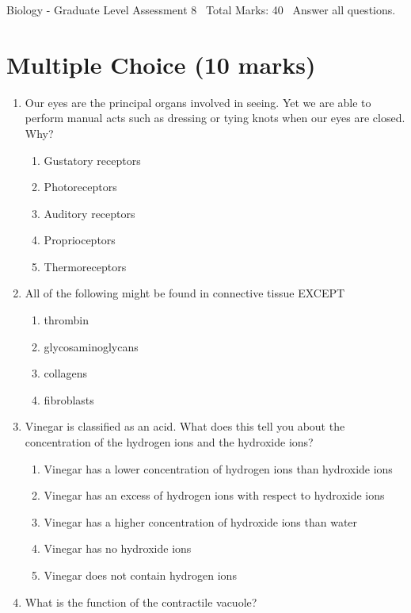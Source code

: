 \documentclass[12pt]{article}
\begin{document}
\begin{center}
Biology - Graduate Level Assessment 8 \
Total Marks: 40 \
Answer all questions.
\end{center}

\section*{Multiple Choice (10 marks)}
\begin{enumerate}[label=\arabic*.]
\item Our eyes are the principal organs involved in seeing. Yet we are able to perform manual acts such as dressing or tying knots when our eyes are closed. Why?
\begin{enumerate}[label=(\alph*)]
    \item Gustatory receptors
    \item Photoreceptors
    \item Auditory receptors
    \item Proprioceptors
    \item Thermoreceptors
\end{enumerate}
\item All of the following might be found in connective tissue EXCEPT
\begin{enumerate}[label=(\alph*)]
    \item thrombin
    \item glycosaminoglycans
    \item collagens
    \item fibroblasts
\end{enumerate}
\item Vinegar is classified as an acid. What does this tell you about the concentration of the hydrogen ions and the hydroxide ions?
\begin{enumerate}[label=(\alph*)]
    \item Vinegar has a lower concentration of hydrogen ions than hydroxide ions
    \item Vinegar has an excess of hydrogen ions with respect to hydroxide ions
    \item Vinegar has a higher concentration of hydroxide ions than water
    \item Vinegar has no hydroxide ions
    \item Vinegar does not contain hydrogen ions
\end{enumerate}
\item What is the function of the contractile vacuole?
\begin{enumerate}[label=(\alph*)]

\end{enumerate}
\end{enumerate}
\end{document}

